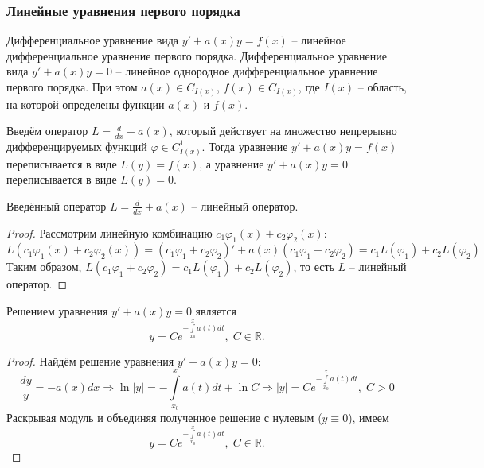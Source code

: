 \subsubsection{Линейные уравнения первого порядка}

\begin{definition}
    Дифференциальное уравнение вида $y' + a(x) y = f(x)$ -- линейное дифференциальное уравнение первого порядка. Дифференциальное уравнение вида $y' + a(x) y = 0$ -- линейное однородное дифференциальное уравнение первого порядка. При этом $a(x) \in C_{I(x)}$, $f(x) \in C_{I(x)}$, где $I(x)$ -- область, на которой определены функции $a(x)$ и $f(x)$. 
\end{definition}

Введём оператор $L = \frac{d}{dx} + a(x)$, который действует на множество непрерывно дифференцируемых функций $\varphi \in C^1_{I(x)}$. Тогда уравнение $y' + a(x) y = f(x)$ переписывается в виде $L(y) = f(x)$, а уравнение $y' + a(x) y = 0$ переписывается в виде $L(y) = 0$.

\begin{theorem}
    Введённый оператор $L = \frac{d}{dx} + a(x)$ -- линейный оператор.
\end{theorem}

\begin{proof}
    Рассмотрим линейную комбинацию $c_1 \varphi_1(x) + c_2 \varphi_2(x)$:
    \begin{equation}
        L(c_1 \varphi_1(x) + c_2 \varphi_2(x)) = (c_1 \varphi_1 + c_2 \varphi_2)' + a(x) (c_1 \varphi_1 + c_2 \varphi_2) = c_1 L(\varphi_1) + c_2 L(\varphi_2)
    \end{equation}
    Таким образом, $L(c_1 \varphi_1 + c_2 \varphi_2) = c_1 L(\varphi_1) + c_2 L(\varphi_2)$, то есть $L$ -- линейный оператор.
\end{proof}

\begin{proposition}
    Решением уравнения $y' + a(x) y = 0$ является
    \begin{equation}
        y = C e^{-\int\limits_{x_0}^{x} a(t) dt}, \; C \in \mathbb{R}.
    \end{equation}
\end{proposition}

\begin{proof}
    Найдём решение уравнения $y' + a(x) y = 0$: 
    \begin{equation}
        \frac{dy}{y} = -a(x) dx \Rightarrow \ln |y| = - \int\limits_{x_0}^{x} a(t) dt + \ln C \Rightarrow |y| = C e^{-\int\limits_{x_0}^{x} a(t) dt}, \; C > 0
    \end{equation}
    Раскрывая модуль и объединяя полученное решение с нулевым ($y \equiv 0$), имеем
    \begin{equation}
        y = C e^{-\int\limits_{x_0}^{x} a(t) dt}, \; C \in \mathbb{R}.
    \end{equation}
\end{proof}

